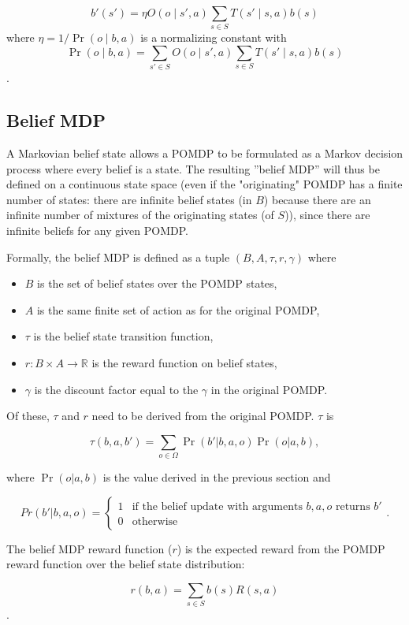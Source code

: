 \documentclass[english]{article}
\numberwithin{equation}{section}
\begin{document}
$$
b'(s') = \eta O(o\mid s',a) \sum_{s\in S} T(s'\mid s,a)b(s)
$$
where $\eta=1/\Pr(o\mid b,a)$ is a normalizing constant with $$\Pr(o\mid b,a) = \sum_{s'\in S}O(o\mid s',a)\sum_{s\in S}T(s'\mid s,a)b(s)$$.

\subsection{Belief MDP}
A Markovian belief state allows a POMDP to be formulated as a Markov decision process where every belief is a state. The resulting ''belief MDP'' will thus be defined on a continuous state space (even if the "originating" POMDP has a finite number of states: there are infinite belief states (in $B$) because there are an infinite number of mixtures of the originating states (of $S$)), since there are infinite beliefs for any given POMDP.

Formally, the belief MDP is defined as a tuple $(B,A,\tau,r,\gamma)$ where

\begin{itemize}
	\item $B$ is the set of belief states over the POMDP states,
	\item $A$ is the same finite set of action as for the original POMDP,
	\item $\tau$ is the belief state transition function,
	\item $r:B \times A \to \mathbb{R}$ is the reward function on belief states,
	\item $\gamma$ is the discount factor equal to the $\gamma$ in the original POMDP. 
\end{itemize}

Of these, $\tau$ and $r$ need to be derived from the original POMDP. $\tau$ is

$$\tau(b,a,b') = \sum_{o\in \Omega} \Pr(b'|b,a,o) \Pr(o | a, b),$$

where $\Pr(o | a,b)$ is the value derived in the previous section and

$$Pr(b'|b,a,o) = \begin{cases}
	1 &\text{if the belief update with arguments } b,a,o \text{ returns } b'  \\
	0 &\text{otherwise }  \end{cases}.$$

The belief MDP reward function ($r$) is the expected reward from the POMDP reward function over the belief state distribution:

$$r(b,a) = \sum_{s\in S} b(s) R(s,a)$$.
\end{document}
